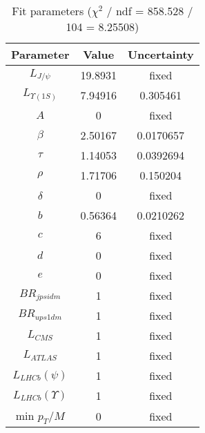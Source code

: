 \begin{table}
\centering
\begin{tabular}{c|c|c}
Parameter & Value & Uncertainty \\
\hline
$L_{J/\psi}$ & 19.8931 & fixed \\
$L_{\Upsilon(1S)}$ & 7.94916 & 0.305461 \\
$A$ & 0 & fixed \\
$\beta$ & 2.50167 & 0.0170657 \\
$\tau$ & 1.14053 & 0.0392694 \\
$\rho$ & 1.71706 & 0.150204 \\
$\delta$ & 0 & fixed \\
$b$ & 0.56364 & 0.0210262 \\
$c$ & 6 & fixed \\
$d$ & 0 & fixed \\
$e$ & 0 & fixed \\
$BR_{jpsidm}$ & 1 & fixed \\
$BR_{ups1dm}$ & 1 & fixed \\
$L_{CMS}$ & 1 & fixed \\
$L_{ATLAS}$ & 1 & fixed \\
$L_{LHCb}(\psi)$ & 1 & fixed \\
$L_{LHCb}(\Upsilon)$ & 1 & fixed \\
min $p_T/M$ & 0 & fixed \\
\end{tabular}
\caption{Fit parameters ($\chi^2$ / ndf = 858.528 / 104 = 8.25508)}
\end{table}
